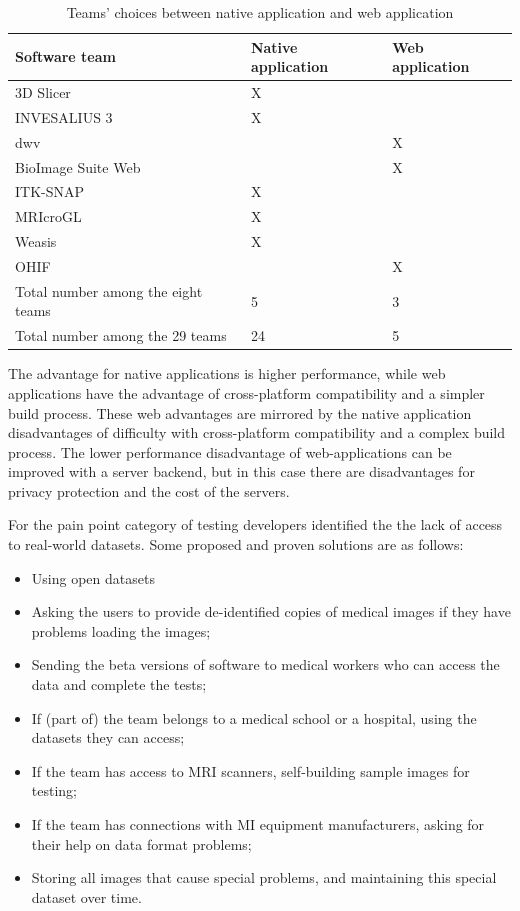 \documentclass[final, 3p, times, authoryear]{elsarticle}
\begin{document}
\begin{table}[!ht]
\centering
\begin{tabular}{lll}
\toprule
Software team & Native application & Web application \\ 
\midrule
3D Slicer & X & \\
INVESALIUS 3 & X & \\
dwv & & X \\
BioImage Suite Web & & X \\
ITK-SNAP & X & \\
MRIcroGL & X & \\
Weasis & X & \\
OHIF & & X \\ 
\midrule
Total number among the eight teams & 5 & 3 \\
Total number among the 29 teams & 24 & 5 \\ 
\bottomrule
\end{tabular}
\caption{Teams' choices between native application and web application}
\label{tab_native_vs_web}
\end{table}

The advantage for native applications is higher performance, while web
applications have the advantage of cross-platform compatibility and a simpler
build process.  These web advantages are mirrored by the native application
disadvantages of difficulty with cross-platform compatibility and a complex
build process.  The lower performance disadvantage of web-applications can be
improved with a server backend, but in this case there are disadvantages for
privacy protection and the cost of the servers.

For the pain point category of testing developers identified the the lack of access to
real-world datasets.  Some proposed and proven solutions are as follows:

\begin{itemize}
\item Using open datasets
\item Asking the users to provide de-identified copies of medical images if they
have problems loading the images;
\item Sending the beta versions of software to medical workers who can access
the data and complete the tests;
\item If (part of) the team belongs to a medical school or a hospital, using the
datasets they can access;
\item If the team has access to MRI scanners, self-building sample images for
testing;
\item If the team has connections with MI equipment manufacturers, asking for
their help on data format problems;
\item Storing all images that cause special problems, and maintaining this
special dataset over time.
\end{itemize}
\end{document}
